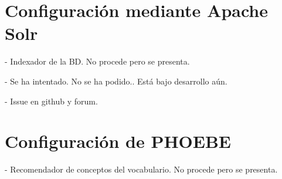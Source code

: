 \section{Configuración mediante Apache Solr}

- Indexador de la BD. No procede pero se presenta.

- Se ha intentado. No se ha podido.. Está bajo desarrollo aún.

- Issue en github y forum.

\section{Configuración de PHOEBE}

- Recomendador de conceptos del vocabulario. No procede pero se presenta.


